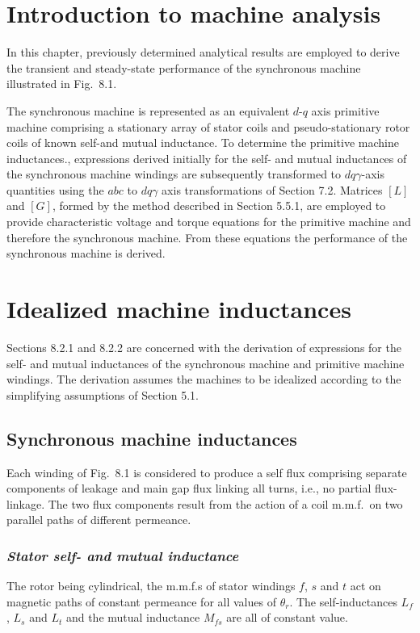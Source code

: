 \documentclass[a4paper,numbers=noenddot,12pt]{scrbook}
\begin{document}
    \section{Introduction to machine analysis}
    In this chapter, previously determined analytical results are employed to derive the transient and steady-state performance of the synchronous machine illustrated in Fig.\ 8.1. 

    The synchronous machine is represented as an equivalent $d$-$q$ axis primitive machine comprising a stationary array of stator coils and pseudo-stationary rotor coils of known self-and mutual inductance. To determine the primitive machine inductances., expressions derived initially for the self- and mutual inductances of the synchronous machine windings are subsequently transformed to $d q \gamma$-axis quantities using the $abc$ to $d q \gamma$ axis transformations of Section 7.2. Matrices
    $[L]$ and $[G]$,  formed by the method described in Section 5.5.1, are employed to provide characteristic voltage and torque equations for the primitive machine and therefore the synchronous machine. From these equations the performance of the synchronous machine is derived. 

    \section{Idealized machine inductances}
    Sections 8.2.1 and 8.2.2 are concerned with the derivation of expressions for the self- and mutual inductances of the synchronous machine and primitive machine windings. The derivation assumes the machines to be idealized according to the simplifying assumptions of Section 5.1.

    \subsection{Synchronous machine inductances}
    Each winding of Fig.\ 8.1 is considered to produce a self flux comprising separate components of leakage and main gap flux linking all turns, i.e., no partial flux-linkage. The two flux components result from the action of a coil m.m.f.\ on two parallel paths of different permeance.

    \subsubsection{\textit{Stator self- and mutual inductance}}
    The rotor being cylindrical, the m.m.f.s of stator windings $f$, $s$ and $t$ act on magnetic paths of constant permeance for all values of $\theta_r$. The self-inductances $L_f$, $L_s$ and $L_t$ and the mutual inductance $M_{fs}$ are all of constant value.
\end{document}
